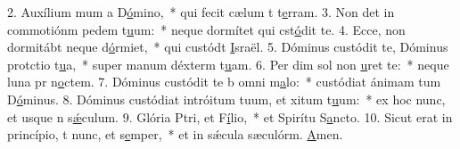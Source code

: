 2. Auxílium mum a D\uline{ó}mino,~* qui fecit cælum t t\uline{e}rram.
3. Non det in commotiónm pedem t\uline{u}um:~* neque dormítet qui cst\uline{ó}dit te.
4. Ecce, non dormitábt neque d\uline{ó}rmiet,~* qui custódt \uline{I}sraël.
5. Dóminus custódit te, Dóminus protctio t\uline{u}a,~* super manum déxterm t\uline{u}am.
6. Per dim sol non \uline{u}ret te:~* neque luna pr n\uline{o}ctem.
7. Dóminus custódit te b omni m\uline{a}lo:~* custódiat ánimam tum D\uline{ó}minus.
8. Dóminus custódiat intróitum tuum, et xitum t\uline{u}um:~* ex hoc nunc, et usque n s\uline{ǽ}culum.
9. Glória Ptri, et F\uline{í}lio,~* et Spirítu S\uline{a}ncto.
10. Sicut erat in princípio, t nunc, et s\uline{e}mper,~* et in sǽcula sæculórm. \uline{A}men.
